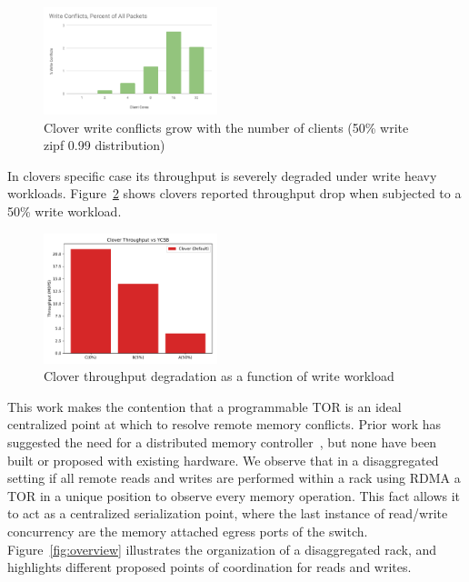 \begin{figure}
    \includegraphics[width=0.45\textwidth]{fig/write_conflicts.pdf}
    \caption{Clover write conflicts grow with the number of clients
    (50\% write zipf 0.99 distribution)}
    \label{fig:conflicts}
\end{figure}


In clovers specific case its throughput is severely degraded under
write heavy workloads. Figure~\ref{fig:clover_tput} shows clovers
reported throughput drop when subjected to a 50\% write workload.

\begin{figure}
    \includegraphics[width=0.45\textwidth]{fig/clover_tput.pdf}
    \caption{Clover throughput degradation as a function of write
    workload}
    \label{fig:clover_tput}
\end{figure}


This work makes the contention that a programmable TOR is an ideal
centralized point at which to resolve remote memory conflicts. Prior
work has suggested the need for a distributed memory
controller~\cite{disandapp}, but none have been built or proposed with
existing hardware. We observe that in a disaggregated setting if all
remote reads and writes are performed within a rack using RDMA a TOR
in a unique position to observe every memory operation.  This fact
allows it to act as a centralized serialization point, where the last
instance of read/write concurrency are the memory attached egress
ports of the switch.  Figure~\ref{fig:overview} illustrates the
organization of a disaggregated rack, and highlights different
proposed points of coordination for reads and writes.


